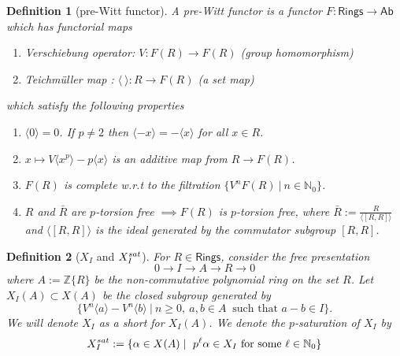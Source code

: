 \documentclass[10pt,a4paper]{amsart}
\newtheorem{definition}{Definition}
\newcommand{\Ab}{{\mathsf{Ab}}}
\newcommand{\N}{{\mathbb N}}
\newcommand{\Rings}{{\mathsf{Rings}}}
\newcommand{\Z}{{\mathbb Z}}
\newcommand{\ab}[1]{\langle {#1} \rangle}
\newcommand{\sat}{{\rm sat}}
\begin{document}
\begin{definition}[pre-Witt functor]\label{def:prewitt}
    A pre-Witt functor is a functor $F:\Rings \to \Ab$ which has functorial maps 
\begin{enumerate}
    \item Verschiebung operator: $V: F(R)\to F(R)$ (group homomorphism)
    \item Teichm\"{u}ller map : $\ab{\ }: R\to F(R)$ (a set map)
\end{enumerate}
which satisfy the following properties 
\begin{enumerate}\label{properties}
    \item $\ab{0}=0$. If $p\neq 2$ then $\ab{-x} = -\ab{x}$ for all $x \in R$.
    \item $x \mapsto V\ab{x^p} -p\ab{x}$ is an additive map from $R \to F(R)$. 
    \item $F(R)$ is complete w.r.t to the filtration $\{V^nF(R)\ | \ n \in \N_0 \}$.
    \item $R$ and $\bar{R}$ are $p$-torsion free $\implies F(R)$ is $p$-torsion free, where $\bar{R} := \frac{R}{\ab{[R,R]}}$ and  $\ab{[R,R]}$ is the ideal generated by the commutator subgroup $[R,R]$. 
\end{enumerate}
\end{definition}

\begin{definition}[$X_I$ and $X_I^{\sat}$]\label{def:XI}
For $R \in \Rings$, consider the free presentation $$0 \to I \to A \to R \to 0 $$ where $A:=\Z \{ R\}$ be the non-commutative polynomial ring on the set $R$.  Let $X_I(A) \subset X(A)$ be the closed subgroup generated by $$\{V^n\ab{a}-V^n\ab{b} \ | \ n\geq 0,  \ a,b\in A \ \text{ such that } a-b\in I\}.$$ We will denote $X_I$ as a short for $X_I(A)$. We denote the $p$-saturation of $X_I$ by 
$$X_I^{\sat} := \{ \alpha \in X(A) \mid \ p^{\ell}\alpha \in X_I  \text{ for some } \ell \in \N_0 \} $$  
\end{definition}
\end{document}
